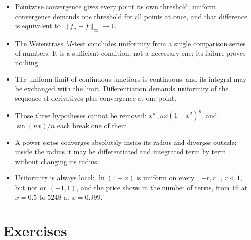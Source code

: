 \begin{ringkasan}
\begin{itemize}
\item Pointwise convergence gives every point its own threshold;
      uniform convergence demands one threshold for all points at once,
      and that difference is equivalent to $\|f_n-f\|_\infty\to0$.
\item The Weierstrass $M$-test concludes uniformity from a single comparison
      series of numbers. It is a sufficient condition, not a necessary one; its failure proves
      nothing.
\item The uniform limit of continuous functions is continuous, and its integral may be exchanged with
      the limit. Differentiation demands uniformity of the sequence of derivatives plus convergence
      at one point.
\item Those three hypotheses cannot be removed: $x^n$, $nx(1-x^2)^n$, and
      $\sin(nx)/n$ each break one of them.
\item A power series converges absolutely inside its radius and diverges outside;
      inside the radius it may be differentiated and integrated term by term
      without changing its radius.
\item Uniformity is always local: $\ln(1+x)$ is uniform on every $[-r,r]$, $r<1$,
      but not on $(-1,1)$, and the price shows in the number of terms, from
      $16$ at $x=0.5$ to $5248$ at $x=0.999$.
\end{itemize}
\end{ringkasan}

\section{Exercises}

